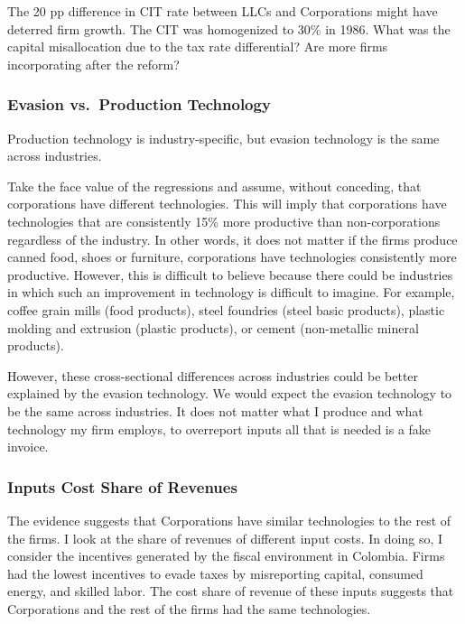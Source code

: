 \documentclass[
  12pt]{article}
\theoremstyle{definition}
\theoremstyle{remark}
\begin{document}
The 20 pp difference in CIT rate between LLCs and Corporations might
have deterred firm growth. The CIT was homogenized to 30\% in 1986. What
was the capital misallocation due to the tax rate differential? Are more
firms incorporating after the reform?

\subsubsection{Evasion vs.~Production
Technology}\label{evasion-vs.-production-technology}

Production technology is industry-specific, but evasion technology is
the same across industries.

Take the face value of the regressions and assume, without conceding,
that corporations have different technologies. This will imply that
corporations have technologies that are consistently 15\% more
productive than non-corporations regardless of the industry. In other
words, it does not matter if the firms produce canned food, shoes or
furniture, corporations have technologies consistently more productive.
However, this is difficult to believe because there could be industries
in which such an improvement in technology is difficult to imagine. For
example, coffee grain mills (food products), steel foundries (steel
basic products), plastic molding and extrusion (plastic products), or
cement (non-metallic mineral products).

However, these cross-sectional differences across industries could be
better explained by the evasion technology. We would expect the evasion
technology to be the same across industries. It does not matter what I
produce and what technology my firm employs, to overreport inputs all
that is needed is a fake invoice.

\subsubsection{Inputs Cost Share of
Revenues}\label{inputs-cost-share-of-revenues}

The evidence suggests that Corporations have similar technologies to the
rest of the firms. I look at the share of revenues of different input
costs. In doing so, I consider the incentives generated by the fiscal
environment in Colombia. Firms had the lowest incentives to evade taxes
by misreporting capital, consumed energy, and skilled labor. The cost
share of revenue of these inputs suggests that Corporations and the rest
of the firms had the same technologies.
\end{document}
